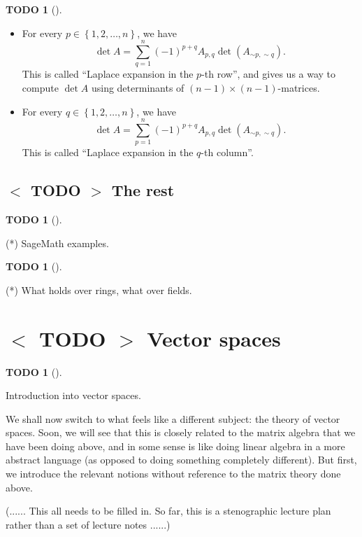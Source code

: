 \documentclass[numbers=enddot,12pt,final,onecolumn,notitlepage]{scrartcl}%
\theoremstyle{definition}
\newtheorem{quest}[theo]{TODO}
\newenvironment{todo}[1][]
{\begin{quest}[#1]\begin{leftbar}}
{\end{leftbar}\end{quest}}
\let\sumnonlimits\sum
\renewcommand{\sum}{\sumnonlimits\limits}
\begin{document}
\begin{todo}
\begin{itemize}
\item For every $p\in\left\{  1,2,\ldots,n\right\}  $, we have%
\[
\det A=\sum_{q=1}^{n}\left(  -1\right)  ^{p+q}A_{p,q}\det\left(  A_{\sim
p,\sim q}\right)  .
\]
This is called \textquotedblleft Laplace expansion in the $p$-th
row\textquotedblright, and gives us a way to compute $\det A$ using
determinants of $\left(  n-1\right)  \times\left(  n-1\right)  $-matrices.

\item For every $q\in\left\{  1,2,\ldots,n\right\}  $, we have%
\[
\det A=\sum_{p=1}^{n}\left(  -1\right)  ^{p+q}A_{p,q}\det\left(  A_{\sim
p,\sim q}\right)  .
\]
This is called \textquotedblleft Laplace expansion in the $q$-th
column\textquotedblright.
\end{itemize}
\end{todo}

\subsection{%
$<$%
TODO%
$>$
The rest}

\begin{todo}
(*) SageMath examples.
\end{todo}

\begin{todo}
(*) What holds over rings, what over fields.
\end{todo}

\section{%
$<$%
TODO%
$>$
Vector spaces}

\begin{todo}
Introduction into vector spaces.

We shall now switch to what feels like a different subject: the theory of
vector spaces. Soon, we will see that this is closely related to the matrix
algebra that we have been doing above, and in some sense is like doing linear
algebra in a more abstract language (as opposed to doing something completely
different). But first, we introduce the relevant notions without reference to
the matrix theory done above.

(...... This all needs to be filled in. So far, this is a stenographic lecture
plan rather than a set of lecture notes ......)
\end{todo}
\end{document}
